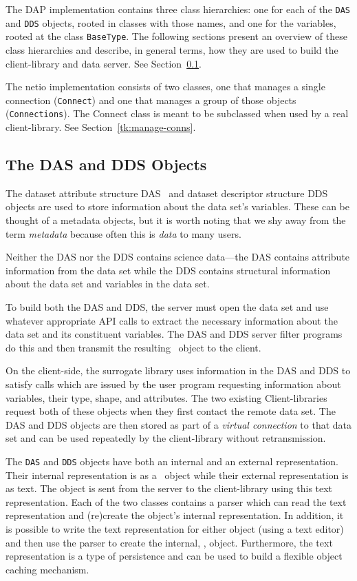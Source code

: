 The DAP implementation contains three class hierarchies: one for each of the
{\tt DAS} and {\tt DDS} objects, rooted in classes with those names, and one
for the variables, rooted at the class {\tt BaseType}. The following sections
present an overview of these class hierarchies and describe, in general
terms, how they are used to build the client-library and data server. See
Section~\ref{das-dds-objects}.

The netio implementation consists of two classes, one that manages a single
connection ({\tt Connect}) and one that manages a group of those objects
({\tt Connections}). The Connect class is meant to be subclassed when used by
a real client-library. See Section~\ref{tk:manage-conns}.

\subsection{The DAS and DDS Objects}
\label{das-dds-objects}

The dataset attribute structure DAS~ and dataset
descriptor structure DDS~ objects are used to store
information about the data set's variables. These can be thought of a
metadata objects, but it is worth noting that we shy away from the term {\em
  metadata\/} because often this is {\em data\/} to many users.

Neither the DAS nor the DDS contains science data---the DAS contains
attribute information from the data set while the DDS contains structural
information about the data set and variables in the data set.

To build both the DAS and DDS, the server must open the data set and use
whatever appropriate API calls to extract the necessary information about the
data set and its constituent variables. The DAS and DDS server filter
programs do this and then transmit the resulting \Cpp\ object to the client.

On the client-side, the surrogate library uses information in the DAS and DDS
to satisfy calls which are issued by the user program requesting information
about variables, their type, shape, and attributes.  The two existing
Client-libraries request both of these objects when they first contact the
remote data set. The DAS and DDS objects are then stored as part of a {\em
  virtual connection\/} to that data set and can be used repeatedly by the
client-library without retransmission.

The {\tt DAS} and {\tt DDS} objects have both an internal and an external
representation. Their internal representation is as a \Cpp\ object while
their external representation is as text. The object is sent from the server
to the client-library using this text representation. Each of the two classes
contains a parser which can read the text representation and (re)create the
object's internal representation. In addition, it is possible to write the
text representation for either object (using a text editor) and then use the
parser to create the internal, \Cpp, object. Furthermore, the text
representation is a type of persistence and can be used to build a flexible
object caching mechanism.

